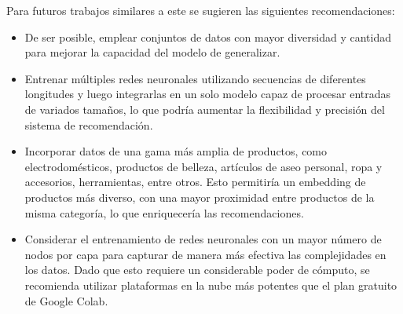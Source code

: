 \documentclass[runningheads]{llncs}
\begin{document}
Para futuros trabajos similares a este se sugieren las siguientes recomendaciones:
\begin{itemize}
	\item De ser posible, emplear conjuntos de datos con mayor diversidad y cantidad para mejorar la capacidad del modelo de generalizar.
	\item Entrenar múltiples redes neuronales utilizando secuencias de diferentes longitudes y luego integrarlas en un solo modelo capaz de procesar entradas de variados tamaños, lo que podría aumentar la flexibilidad y precisión del sistema de recomendación.
	\item Incorporar datos de una gama más amplia de productos, como electrodomésticos, productos de belleza, artículos de aseo personal, ropa y accesorios, herramientas, entre otros. Esto permitiría un embedding de productos más diverso, con una mayor proximidad entre productos de la misma categoría, lo que enriquecería las recomendaciones.
	\item Considerar el entrenamiento de redes neuronales con un mayor número de nodos por capa para capturar de manera más efectiva las complejidades en los datos. Dado que esto requiere un considerable poder de cómputo, se recomienda utilizar plataformas en la nube más potentes que el plan gratuito de Google Colab.
\end{itemize}



\end{document}
